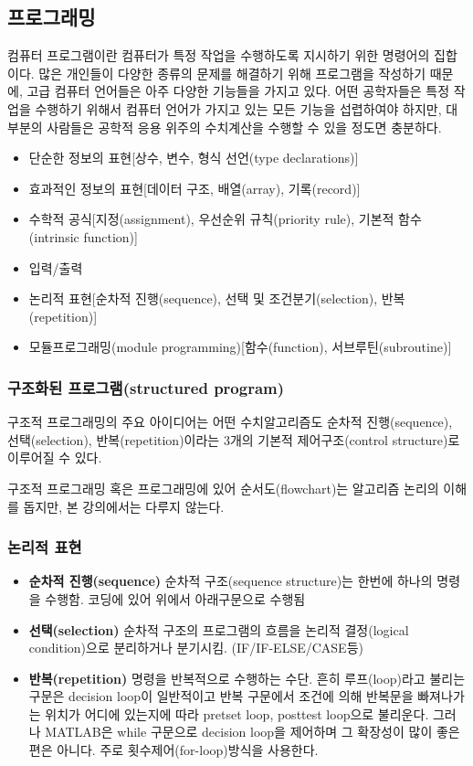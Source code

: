 \subsection{프로그래밍}

컴퓨터 프로그램이란 컴퓨터가 특정 작업을 수행하도록 지시하기 위한 명령어의 집합이다. 많은 개인들이 다양한 종류의 문제를 해결하기 위해 프로그램을 작성하기 때문에, 고급 컴퓨터 언어들은 아주 다양한 기능들을 가지고 있다. 어떤 공학자들은 특정 작업을 수행하기 위해서 컴퓨터 언어가 가지고 있는 모든 기능을 섭렵하여야 하지만, 대부분의 사람들은 공학적 응용 위주의 수치계산을 수행할 수 있을 정도면 충분하다.

\begin{itemize}
\item 단순한 정보의 표현[상수, 변수, 형식 선언(type declarations)]
\item 효과적인 정보의 표현[데이터 구조, 배열(array), 기록(record)]
\item 수학적 공식[지정(assignment), 우선순위 규칙(priority rule), 기본적 함수(intrinsic function)]
\item 입력/출력
\item 논리적 표현[순차적 진행(sequence), 선택 및 조건분기(selection), 반복(repetition)]
\item 모듈프로그래밍(module programming)[함수(function), 서브루틴(subroutine)]
\end{itemize}

\subsubsection{구조화된 프로그램(structured program)}
구조적 프로그래밍의 주요 아이디어는 어떤 수치알고리즘도 순차적 진행(sequence), 선택(selection), 반복(repetition)이라는 3개의 기본적 제어구조(control structure)로 이루어질 수 있다.

구조적 프로그래밍 혹은 프로그래밍에 있어 순서도(flowchart)는 알고리즘 논리의 이해를 돕지만, 본 강의에서는 다루지 않는다.

\subsubsection{논리적 표현}

\begin{itemize}
\item \textbf{순차적 진행(sequence)} 순차적 구조(sequence structure)는 한번에 하나의 명령을 수행함. 코딩에 있어 위에서 아래구문으로 수행됨
\item \textbf{선택(selection)} 순차적 구조의 프로그램의 흐름을 논리적 결정(logical condition)으로 분리하거나 분기시킴. (IF/IF-ELSE/CASE등)
\item \textbf{반복(repetition)} 명령을 반복적으로 수행하는 수단. 흔히 루프(loop)라고 불리는 구문은 decision loop이 일반적이고 반복 구문에서 조건에 의해 반복문을 빠져나가는 위치가 어디에 있는지에 따라 pretset loop, posttest loop으로 불리운다. 그러나 MATLAB은 while 구문으로 decision loop을 제어하며 그 확장성이 많이 좋은편은 아니다. 주로 횟수제어(for-loop)방식을 사용한다.
\end{itemize}

